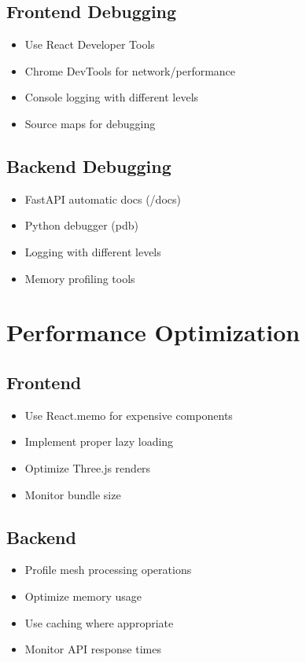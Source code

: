 \subsection{Frontend Debugging}
\begin{itemize}
    \item Use React Developer Tools
    \item Chrome DevTools for network/performance
    \item Console logging with different levels
    \item Source maps for debugging
\end{itemize}

\subsection{Backend Debugging}
\begin{itemize}
    \item FastAPI automatic docs (/docs)
    \item Python debugger (pdb)
    \item Logging with different levels
    \item Memory profiling tools
\end{itemize}

\section{Performance Optimization}
\subsection{Frontend}
\begin{itemize}
    \item Use React.memo for expensive components
    \item Implement proper lazy loading
    \item Optimize Three.js renders
    \item Monitor bundle size
\end{itemize}

\subsection{Backend}
\begin{itemize}
    \item Profile mesh processing operations
    \item Optimize memory usage
    \item Use caching where appropriate
    \item Monitor API response times
\end{itemize}

